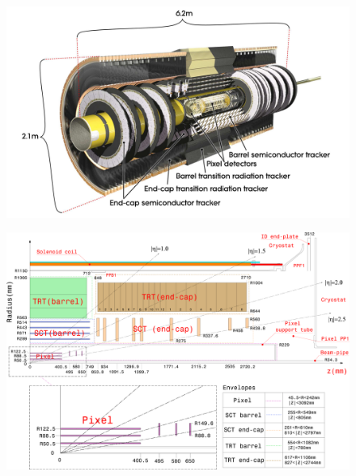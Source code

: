 \begin{figure}[hbtp]
\includegraphics[width=\fullfig]{figures/id_overview.pdf}
\caption{}
\label{fig:id_overview}
\end{figure}

\begin{figure}[hbtp]
\includegraphics[width=\fullfig]{figures/id_detail_schematic.pdf}
\caption{}
\label{fig:id_detail_schematic}
\end{figure}


